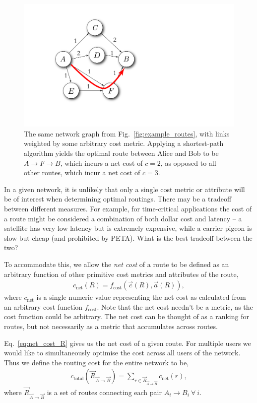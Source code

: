 \documentclass[aps,rmp,twocolumn,amsmath,amssymb,nofootinbib,superscriptaddress]{revtex4}
\begin{document}
\begin{figure}[!htb]
\includegraphics[width=0.6\columnwidth]{example_opt}
\caption{The same network graph from Fig.~\ref{fig:example_routes}, with links weighted by some arbitrary cost metric. Applying a shortest-path algorithm yields the optimal route between Alice and Bob to be \mbox{$A\to F\to B$}, which incurs a net cost of \mbox{$c=2$}, as opposed to all other routes, which incur a net cost of \mbox{$c=3$}.} \label{fig:simp_route_opt}
\end{figure}

In a given network, it is unlikely that only a single cost metric or attribute will be of interest when determining optimal routings. There may be a tradeoff between different measures. For example, for time-critical applications the cost of a route might be considered a combination of both dollar cost and latency -- a satellite has very low latency but is extremely expensive, while a carrier pigeon is slow but cheap (and prohibited by PETA). What is the best tradeoff between the two?

To accommodate this, we allow the \emph{net cost} of a route to be defined as an arbitrary function of other primitive cost metrics and attributes of the route,
\begin{align} \label{eq:net_cost_R}
c_\mathrm{net}(R) = f_\mathrm{cost}(\vec{c}(R),\vec{a}(R)),
\end{align}
where $c_\mathrm{net}$ is a single numeric value representing the net cost as calculated from an arbitrary cost function $f_\mathrm{cost}$. Note that the net cost needn't be a metric, as the cost function could be arbitrary. The net cost can be thought of as a ranking for routes, but not necessarily as a metric that accumulates across routes.

Eq.~\ref{eq:net_cost_R} gives us the net cost of a given route. For multiple users we would like to simultaneously optimise the cost across all users of the network. Thus we define the routing cost for the entire network to be,
\begin{align} \label{eq:c_total}
c_\mathrm{total}(\vec{R}_{\vec{A}\to \vec{B}}) = \sum_{r \in {\vec R}_{\vec{A}\to \vec{B}}} c_\mathrm{net}(r),
\end{align}
where $\vec{R}_{\vec{A}\to \vec{B}}$ is a set of routes connecting each pair \mbox{$A_i\to B_i~\forall ~ i$}.
\end{document}
